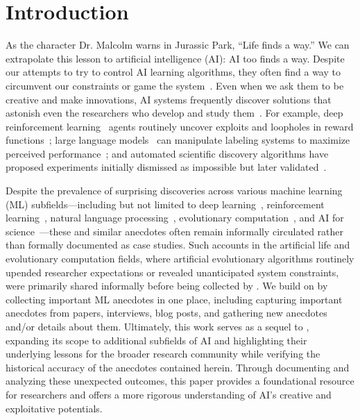 \documentclass[10pt]{article}
\def\citep#1{}%
\def\citet#1{}%
\begin{document}
\section{Introduction}

As the character Dr. Malcolm warns in Jurassic Park, ``Life finds a way.'' 
We can extrapolate this lesson to artificial intelligence (AI): AI too finds a way.
Despite our attempts to try to control AI learning algorithms, they often find a way to circumvent our constraints or game the system~\citep{lehman2018surprising}. 
Even when we ask them to be creative and make innovations, AI systems frequently discover solutions that astonish even the researchers who develop and study them~\citep{lehman2018surprising}.
For example, deep reinforcement learning~\citep{mnih2015human, sutton2018reinforcement} agents routinely uncover exploits and loopholes in reward functions~\citep{amodei2016concrete};
large language models~\citep{openai_gpt3.5, claude3family, comanici2025gemini} can manipulate labeling systems to maximize perceived performance~\citep{pourcel2024acesgeneratingdiverseprogramming};
and automated scientific discovery algorithms have proposed experiments initially dismissed as impossible but later validated~\citep{KrennEntangle2017}. 

Despite the prevalence of surprising discoveries across various machine learning (ML) subfields---including but not limited to deep learning~\citep{Goodfellow2016deeplearning}, reinforcement learning~\citep{sutton2018reinforcement}, natural language processing~\citep{jm3nlpbook}, evolutionary computation~\citep{lehman2018surprising}, and AI for science~\citep{Wang2023ai4science}---these and similar anecdotes often remain informally circulated rather than formally documented as case studies.
Such accounts in the artificial life and evolutionary computation fields, where artificial evolutionary algorithms routinely upended researcher expectations or revealed unanticipated system constraints, were primarily shared informally before being collected by \citet{lehman2018surprising}. 
We build on \citet{lehman2018surprising} by collecting important ML anecdotes in one place, including capturing important anecdotes from papers, interviews, blog posts, and gathering new anecdotes and/or details about them. 
Ultimately, this work serves as a sequel to \citet{lehman2018surprising}, expanding its scope to additional subfields of AI and highlighting their underlying lessons for the broader research community while verifying the historical accuracy of the anecdotes contained herein. 
Through documenting and analyzing these unexpected outcomes, this paper provides a foundational resource for researchers and offers a more rigorous understanding of AI's creative and exploitative potentials.
\end{document}
